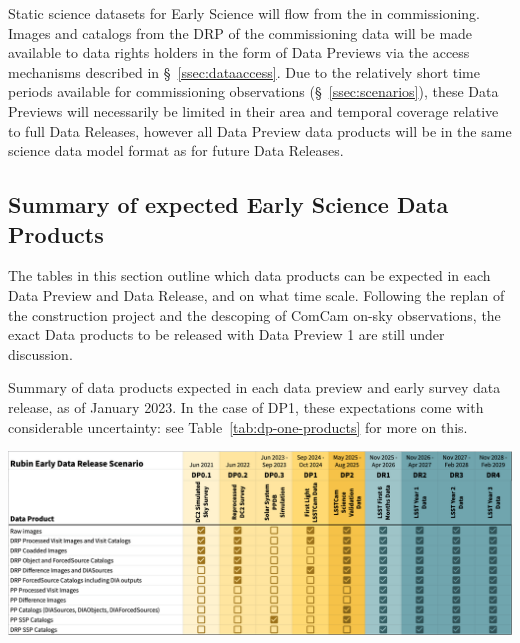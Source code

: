 Static science datasets for Early Science will flow from the \svs in commissioning.
Images and catalogs from the DRP of the commissioning data will be made available to data rights holders in the form of Data Previews via the access mechanisms described in \S~\ref{ssec:dataaccess}.
Due to the relatively short time periods available for commissioning observations (\S~\ref{ssec:scenarios}), these Data Previews will necessarily be limited in their area and temporal coverage relative to full Data Releases, however all Data Preview data products will be in the same science data model format as for future Data Releases.

\subsection{Summary of expected Early Science Data Products} \label{ssec:dataproductsummary}
The tables in this section outline which data products can be expected in each Data Preview and Data Release, and on what time scale.
Following the replan of the construction project and the descoping of ComCam on-sky observations, the exact Data products to be released with Data Preview 1 are still under discussion.

\begin{table}
\caption{Summary of data products expected in each data preview and early survey data release, as of January 2023.
In the case of DP1, these expectations come with considerable uncertainty: see Table~\ref{tab:dp-one-products} for more on this.}
\label{tab:summary}
\includegraphics[width=\linewidth]{figures/DPR-summary}
\end{table}


